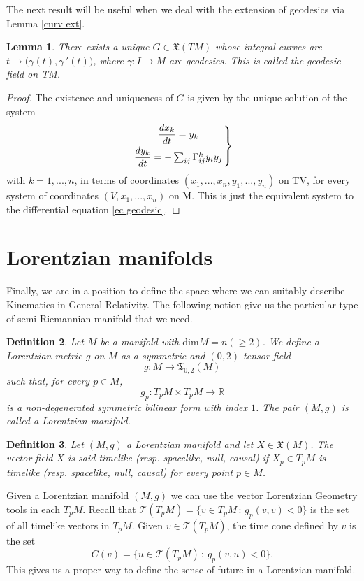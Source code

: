 \documentclass[11pt]{book}
\newtheorem{defi}{Definition}[chapter]
\newtheorem{lem}[defi]{Lemma}
\def\R{\mathbb R}
\def\T{\mathcal T}
\def\t{\mathfrak T}
\def\x{\mathfrak X}
\begin{document}
The next result will be useful when we deal with the extension of geodesics via Lemma \ref{curv ext}.
\begin{lem}\label{campo de vectores geodesic}
	There exists a unique $G\in \x(TM)$ whose integral curves are $t\longrightarrow \big(\gamma(t), \gamma\,'(t)\big)$, where $\gamma:I\longrightarrow M$ are geodesics. This is called the geodesic field on TM.
\end{lem}
\begin{proof}
	The existence and uniqueness of $G$ is given by the unique solution of the system 
	$$\left.
	\dfrac{dx_k}{dt} = y_k \atop
	\dfrac{dy_k}{dt}= - \sum_{ij} \Gamma^k _{ij} y_i y_j
	\right\}$$
	with $k=1,...,n$, in terms of coordinates $(x_1,...,x_n,y_1,...,y_n)$ on TV, for every system of coordinates $(V,x_1,...,x_n)$ on M. This is just the equivalent system to the differential equation \ref{ec geodesic}.
\end{proof}

\section{Lorentzian manifolds}
Finally, we are in a position to define the space where we can suitably describe Kinematics in General Relativity. The following notion give us the particular type of semi-Riemannian manifold that we need.
\begin{defi}
	Let $M$ be a manifold with $\text{dim}M=n(\ge 2)$. We define a Lorentzian metric $g$ on $M$ as a symmetric and $(0,2)$ tensor field
	\[
	g:M\to \t_{0,2}(M)
	\]
	such that, for every $p\in M$, 
	\[
	g_p : T_pM \times T_pM \longrightarrow \R
	\]
	is a non-degenerated symmetric bilinear form with index $1$. The pair $(M,g)$ is called a Lorentzian manifold. 
\end{defi}

\begin{defi}
	Let $(M,g)$ a Lorentzian manifold and let $X\in \x(M)$. The vector field $X$ is said timelike (resp. spacelike, null, causal) if $X_p\in T_pM$ is  timelike (resp. spacelike, null, causal) for every point $p\in M$.
\end{defi}

Given a Lorentzian manifold $(M,g)$ we can use the vector Lorentzian Geometry tools in each $T_pM$. Recall that $\T(T_pM)=\{v\in T_pM \, : \, g_p(v,v)<0\}$ is the set of all timelike vectors in $T_pM$. Given $v\in \T(T_pM)$, the time cone defined by $v$ is the set
$$C(v)=\{u\in \T(T_pM) \, : \, g_p(v,u)<0\}.$$ This gives us a proper way to define the sense of future in a Lorentzian manifold.
\end{document}
